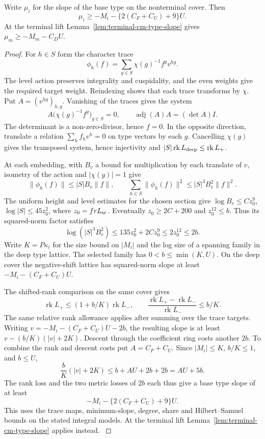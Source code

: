 \begin{proposition}\label{prop:covolume-trace-descent}
Write \(\mu_i\) for the slope of the base type on the nonterminal cover. Then
\[
 \mu_i\ge-M_i-\{2(C_F+C_U)+9\}U.
\]
 At the terminal lift Lemma~\ref{lem:terminal-cm-type-slope} gives \(\mu_m\ge-M_m-C_D U\).
\end{proposition}
\begin{proof}
For \(h\in S\) form the character trace
\[
 \phi_h(f)=\sum_{g\in S}\chi(g)^{-1} f^g v^{hg}.
\]
The level action preserves integrality and cuspidality, and the
even weights give the required target weight. Reindexing shows
that each trace transforms by \(\chi\). Put \(A=(v^{hg})_{h,g}\). Vanishing of the traces gives the system
\[
 A\bigl(\chi(g)^{-1} f^g\bigr)_{g\in S}=0,\qquad
 \operatorname{adj}(A) A=(\det A) I .
\]
The determinant is a non-zero-divisor, hence \(f=0\). In the
opposite direction, translate a relation \(\sum_h f_hv^h=0\)
on type vectors by each \(g\). Cancelling \(\chi(g)\) gives the
transposed system, hence injectivity and
\(|S|\operatorname{rk} L_{\rm deep}\le\operatorname{rk} L_+\).
\label{cor:covolume-component-transfer-16}

At each embedding, with \(B_v\) a bound for multiplication by
each translate of \(v\), isometry of the action and \(|\chi(g)|=1\)
give
\[
 \|\phi_h(f)\|\le |S|B_v\|f\|,\qquad
 \sum_{h\in S}\|\phi_h(f)\|^2\le |S|^3 B_v^2\|f\|^2 .
\]
The uniform height and level estimates for the chosen section
give \(\log B_v\le C z_0^9\), \(\log |S|\le45z_0^2\),
where \(z_0=fr L_{\rm sc}\). Eventually \(z_0\ge2C+200\)
and \(z_0^{12}\le b\). Thus its squared-norm factor satisfies
\[
 \log(|S|^3 B_v^2)\le135z_0^2+2Cz_0^9\le2z_0^{12}\le2b.
\] Write \(K=P\kappa_i\) for the size bound on
\(|M_i|\) and the log size of a spanning family in the deep
type lattice. The selected
family has \(0<b\le\min(K,U)\). On the deep cover the
negative-shift lattice has squared-norm slope at least
\(-M_i-(C_F+C_U)U\).

The shifted-rank comparison on the same cover gives
\[
 \operatorname{rk}L_+\le(1+b/K)\operatorname{rk}L_-,
 \qquad
 \frac{\operatorname{rk}L_+-\operatorname{rk}L_-}
      {\operatorname{rk}L_-}\le b/K .
\]
The same relative rank allowance applies after summing over the
trace targets. Writing
\(v=-M_i-(C_F+C_U)U-2b\), the resulting slope is at least
\(v-(b/K)(|v|+2K)\). Descent through the coefficient ring
costs another \(2b\). To combine the rank and descent costs put \(A=C_F+C_U\). Since
\(|M_i|\le K\), \(b/K\le1\), and \(b\le U\),
\[
 \frac bK (|v|+2K)
   \le b+AU+2b+2b=AU+5b .
\]
The rank loss and the two metric losses of \(2b\) each thus give
a base type slope of at least
\[
                    -M_i-\{2(C_F+C_U)+9\}U .
\]
This uses the trace maps, minimum-slope, degree, share and
Hilbert--Samuel bounds on the stated integral models.
At the terminal lift Lemma~\ref{lem:terminal-cm-type-slope} applies instead. \label{cor:covolume-component-transfer-17}
\end{proof}
